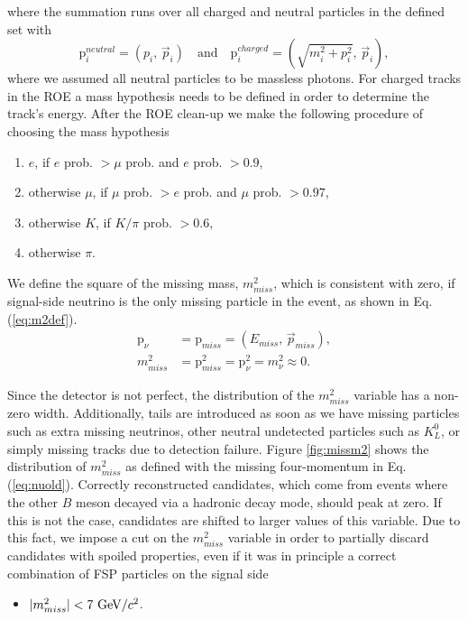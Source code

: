 where the summation runs over all charged and neutral particles in the defined set with
\begin{equation}
\mathrm{p}^{neutral}_i = \left(p_i,\, \vec{p}_i \right) \quad \mathrm{and} \quad \mathrm{p}^{charged}_i = \left(\sqrt{m_i^2 + p_i^2},\, \vec{p}_i \right),
\label{eq:pcharged}
\end{equation}
where we assumed all neutral particles to be massless photons. For charged tracks in the ROE a mass hypothesis needs to be defined in order to determine the track's energy. After the ROE clean-up we make the following procedure of choosing the mass hypothesis
\begin{enumerate}
\item $e$, if $e$ prob. $> \mu$ prob. and $e$ prob. $> 0.9$,
\item otherwise $\mu$, if $\mu$ prob. $> e$ prob. and $\mu$ prob. $> 0.97$,
\item otherwise $K$, if $K/\pi$ prob. $> 0.6$,
\item otherwise $\pi$.
\end{enumerate} 
We define the square of the missing mass, $m_{miss}^2$, which is consistent with zero, if signal-side neutrino is the only missing particle in the event, as shown in Eq. (\ref{eq:m2def}).
\begin{align}
\label{eq:nuold}
\mathrm{p}_\nu &= \mathrm{p}_{miss} = \left(E_{miss},\,\vec{p}_{miss} \right),\\
\label{eq:m2def}
m_{miss}^2 &= \mathrm{p}_{miss}^2 = \mathrm{p}_{\nu}^2 = m_\nu^2 \approx 0.
\end{align}

Since the detector is not perfect, the distribution of the $m_{miss}^2$ variable has a non-zero width. Additionally, tails are introduced as soon as we have missing particles such as extra missing neutrinos, other neutral undetected particles such as $K_L^0$, or simply missing tracks due to detection failure. Figure \ref{fig:missm2} shows the distribution of $m_{miss}^2$ as defined with the missing four-momentum in Eq. (\ref{eq:nuold}). Correctly reconstructed candidates, which come from events where the other $B$ meson decayed via a hadronic decay mode, should peak at zero. If this is not the case, candidates are shifted to larger values of this variable. Due to this fact, we impose a cut on the $m_{miss}^2$ variable in order to partially discard candidates with spoiled properties, even if it was in principle a correct combination of FSP particles on the signal side
\begin{itemize}
\item $\vert m_{miss}^2 \vert < 7\mathrm{~GeV}/c^2$.
\end{itemize}

